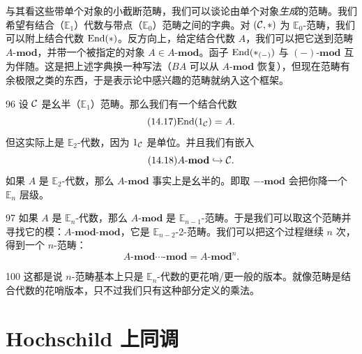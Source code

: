 与其看这些带单个对象的小截断范畴，我们可以谈论由单个对象\emph{生成}的范畴。我们希望有结合（$\mathbb{E}_1$）代数与带点（$\mathbb{E}_0$）范畴之间的字典。对 $(\mathcal{C},*)$ 为 $\mathbb{E}_0$-范畴，我们可以附上结合代数 $\mathrm{End}(*)$。反方向上，给定结合代数 $A$，我们可以把它送到范畴 $A\text{-}\mathbf{mod}$，并带一个被指定的对象 $A\in A\text{-}\mathbf{mod}$。函子 $\mathrm{End}(*_{(-)})$ 与 $(-)\text{-}\mathbf{mod}$ 互为伴随。这是把上述字典换一种写法（$BA$ 可以从 $A\text{-}\mathbf{mod}$ 恢复），但现在范畴有余极限之类的东西，于是表示论中感兴趣的范畴就纳入这个框架。

\begin{srcex}{96}
设 $\mathcal{C}$ 是幺半（$\mathbb{E}_1$）范畴。那么我们有一个结合代数
\begin{equation}\tag{14.17}
\mathrm{End}(1_{\mathcal{C}})=A.
\end{equation}
但这实际上是 $\mathbb{E}_2$-代数，因为 $1_{\mathcal{C}}$ 是单位。并且我们有嵌入
\begin{equation}\tag{14.18}
A\text{-}\mathbf{mod}\hookrightarrow\mathcal{C}.
\end{equation}
如果 $A$ 是 $\mathbb{E}_2$-代数，那么 $A\text{-}\mathbf{mod}$ 事实上是幺半的。即取 $-\text{-}\mathbf{mod}$ 会把你降一个 $\mathbb{E}_n$ 层级。
\end{srcex}

\begin{srcex}{97}
如果 $A$ 是 $\mathbb{E}_n$-代数，那么 $A\text{-}\mathbf{mod}$ 是 $\mathbb{E}_{n-1}$-范畴。于是我们可以取这个范畴并寻找它的模：$A\text{-}\mathbf{mod}\text{-}\mathbf{mod}$，它是 $\mathbb{E}_{n-2}$-2-范畴。我们可以把这个过程继续 $n$ 次，得到一个 $n$-范畴：
\begin{equation}\tag{14.19}
A\text{-}\mathbf{mod}\cdots\text{-}\mathbf{mod}=A\text{-}\mathbf{mod}^n.
\end{equation}
\end{srcex}

\begin{srcrem}{100}
这都是说 $n$-范畴基本上只是 $\mathbb{E}_n$-代数的更花哨/更一般的版本。就像范畴是结合代数的花哨版本，只不过我们只有这种部分定义的乘法。
\end{srcrem}

\section{Hochschild 上同调}\label{sec:14-2}

